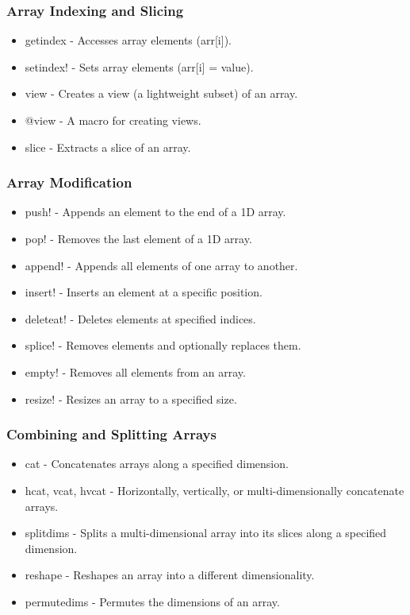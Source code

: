 \documentclass{report}
\begin{document}
    \bigbreak \noindent 
    \subsubsection{Array Indexing and Slicing}
    \begin{itemize}
        \item getindex - Accesses array elements (arr[i]).
        \item setindex! - Sets array elements (arr[i] = value).
        \item view - Creates a view (a lightweight subset) of an array.
        \item @view - A macro for creating views.
        \item slice - Extracts a slice of an array.
    \end{itemize}

    \bigbreak \noindent 
    \subsubsection{Array Modification}
    \begin{itemize}
        \item push! - Appends an element to the end of a 1D array.
        \item pop! - Removes the last element of a 1D array.
        \item append! - Appends all elements of one array to another.
        \item insert! - Inserts an element at a specific position.
        \item deleteat! - Deletes elements at specified indices.
        \item splice! - Removes elements and optionally replaces them.
        \item empty! - Removes all elements from an array.
        \item resize! - Resizes an array to a specified size.
    \end{itemize}

    \bigbreak \noindent 
    \subsubsection{Combining and Splitting Arrays}
    \bigbreak \noindent 
    \begin{itemize}
        \item cat - Concatenates arrays along a specified dimension.
        \item hcat, vcat, hvcat - Horizontally, vertically, or multi-dimensionally concatenate arrays.
        \item splitdims - Splits a multi-dimensional array into its slices along a specified dimension.
        \item reshape - Reshapes an array into a different dimensionality.
        \item permutedims - Permutes the dimensions of an array.
    \end{itemize}
\end{document}

